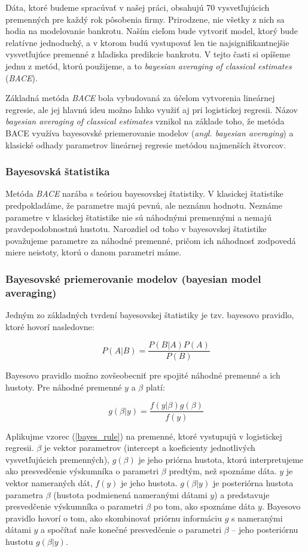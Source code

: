 Dáta, ktoré budeme spracúvať v našej práci, obsahujú 70 vysvetľujúcich premenných pre každý rok pôsobenia firmy.
Prirodzene, nie všetky z nich sa hodia na modelovanie bankrotu.
Naším cieľom bude vytvoriť model, ktorý bude relatívne jednoduchý, a v ktorom budú vystupovať len tie najsignifikantnejšie vysvetľujúce premenné z hľadiska predikcie bankrotu.
V tejto časti si opíšeme jednu z metód, ktorú použijeme, a to \emph{bayesian averaging of classical estimates} (\emph{BACE}).

Základná metóda \emph{BACE} bola vybudovaná za účelom vytvorenia lineárnej regresie, ale jej hlavnú ideu možno ľahko využiť aj pri logistickej regresii.
Názov \emph{bayesian averaging of classical estimates} vznikol na základe toho, že metóda BACE využíva bayesovské priemerovanie modelov (\emph{angl. bayesian averaging}) a klasické odhady parametrov lineárnej regresie metódou najmenších štvorcov.

\subsubsection{Bayesovská štatistika}

Metóda \emph{BACE} narába s teóriou bayesovskej štatistiky.
V klasickej štatistike predpokladáme, že parametre majú pevnú, ale neznámu hodnotu.
Neznáme parametre v klasickej štatistike nie sú náhodnými premennými a nemajú pravdepodobnostnú hustotu.
Narozdiel od toho v bayesovskej štatistike považujeme parametre za náhodné premenné, pričom ich náhodnosť zodpovedá miere neistoty, ktorú o danom parametri máme.

\subsubsection{Bayesovské priemerovanie modelov (bayesian model averaging)}

Jedným zo základných tvrdení bayesovskej štatistiky je tzv. bayesovo pravidlo, ktoré hovorí nasledovne:

\[
P(A|B) = \frac{P(B|A) P(A)}{P(B)}
\]

Bayesovo pravidlo možno zovšeobecniť pre spojité náhodné premenné a ich hustoty. Pre náhodné premenné \(y\) a \( \beta \) platí:

\begin{equation} \label{bayes_rule}
    g(\beta | y) = \frac{f(y | \beta) g(\beta)}{f(y)}
\end{equation}

Aplikujme vzorec (\ref{bayes_rule}) na premenné, ktoré vystupujú v logistickej regresii.
\( \beta \) je vektor parametrov (intercept a koeficienty jednotlivých vysvetľujúcich premenných),
\( g(\beta) \) je jeho priórna hustota, ktorú interpretujeme ako presvedčenie výskumníka o parametri \( \beta \) predtým, než spoznáme dáta.
\( y \) je vektor nameraných dát, \( f(y) \) je jeho hustota.
\( g(\beta | y) \) je posteriórna hustota parametra \( \beta \) (hustota podmienená nameranými dátami \( y \)) a predstavuje presvedčenie výskumníka o parametri \( \beta \) po tom, ako spoznáme dáta \( y \).
Bayesovo pravidlo hovorí o tom, ako skombinovať priórnu informáciu \( g \) s nameranými dátami \( y \) a spočítať naše konečné presvedčenie o parametri \( \beta \) – jeho posteriórnu hustotu \( g(\beta|y) \).

